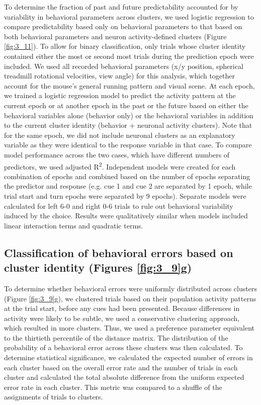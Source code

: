 To determine the fraction of past and future predictability accounted for by variability in behavioral parameters across clusters, we used logistic regression to compare predictability based only on behavioral parameters to that based on both behavioral parameters and neuron activity-defined clusters (Figure \ref{fig:3_11}). To allow for binary classification, only trials whose cluster identity contained either the most or second most trials during the prediction epoch were included. We used all recorded behavioral parameters (x/y position, spherical treadmill rotational velocities, view angle) for this analysis, which together account for the mouse’s general running pattern and visual scene. At each epoch, we trained a logistic regression model to predict the activity pattern at the current epoch or at another epoch in the past or the future based on either the behavioral variables alone (behavior only) or the behavioral variables in addition to the current cluster identity (behavior + neuronal activity clusters). Note that for the same epoch, we did not include neuronal clusters as an explanatory variable as they were identical to the response variable in that case. To compare model performance across the two cases, which have different numbers of predictors, we used adjusted R\textsuperscript{2}. Independent models were created for each combination of epochs and combined based on the number of epochs separating the predictor and response (e.g. cue 1 and cue 2 are separated by 1 epoch, while trial start and turn epochs were separated by 9 epochs). Separate models were calculated for left 6-0 and right 0-6 trials to rule out behavioral variability induced by the choice. Results were qualitatively similar when models included linear interaction terms and quadratic terms. 

 

\subsection[Classification of behavioral errors based on cluster identity]{Classification of behavioral errors based on cluster identity (Figures \ref{fig:3_9}g)} \label{methods:clustering_behav_error}

To determine whether behavioral errors were uniformly distributed across clusters (Figure \ref{fig:3_9}g), we clustered trials based on their population activity patterns at the trial start, before any cues had been presented. Because differences in activity were likely to be subtle, we used a conservative clustering approach, which resulted in more clusters. Thus, we used a preference parameter equivalent to the thirtieth percentile of the distance matrix. The distribution of the probability of a behavioral error across these clusters was then calculated. To determine statistical significance, we calculated the expected number of errors in each cluster based on the overall error rate and the number of trials in each cluster and calculated the total absolute difference from the uniform expected error rate in each cluster. This metric was compared to a shuffle of the assignments of trials to clusters.

